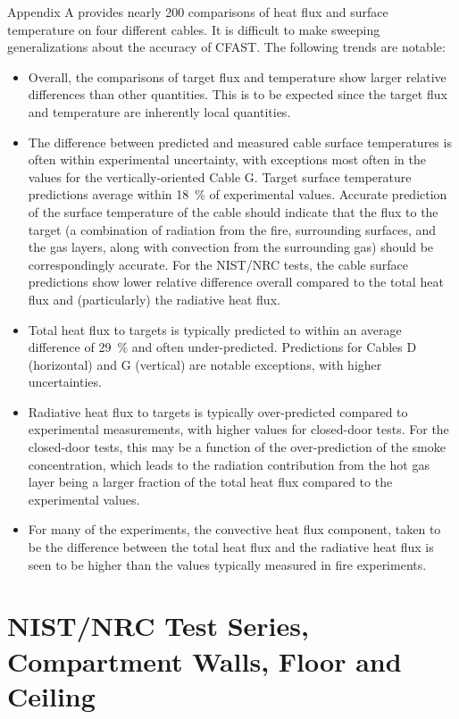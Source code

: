 Appendix A provides nearly 200 comparisons of heat flux and surface temperature on four different cables.  It is difficult to make sweeping generalizations about the accuracy of CFAST.  The following trends are notable:
\begin{itemize}
\item Overall, the comparisons of target flux and temperature show larger relative differences than other quantities. This is to be expected since the target flux and temperature are inherently local quantities.
\item The difference between predicted and measured cable surface temperatures is often within experimental uncertainty, with exceptions most often in the values for the vertically-oriented Cable G.  Target surface temperature predictions average within 18~\% of experimental values.  Accurate prediction of the surface temperature of the cable should indicate that the flux to the target (a combination of radiation from the fire, surrounding surfaces, and the gas layers, along with convection from the surrounding gas) should be correspondingly accurate.  For the NIST/NRC tests, the cable surface predictions show lower relative difference overall compared to the total heat flux and (particularly) the radiative heat flux.
\item Total heat flux to targets is typically predicted to within an average difference of 29~\% and often under-predicted.  Predictions for Cables D (horizontal) and G (vertical) are notable exceptions, with higher uncertainties.
\item Radiative heat flux to targets is typically over-predicted compared to experimental measurements, with higher values for closed-door tests.  For the closed-door tests, this may be a function of the over-prediction of the smoke concentration, which leads to the radiation contribution from the hot gas layer being a larger fraction of the total heat flux compared to the experimental values.
\item For many of the experiments, the convective heat flux component, taken to be the difference between the total heat flux and the radiative heat flux is seen to be higher than the values typically measured in fire experiments.
\end{itemize}


\section{NIST/NRC Test Series, Compartment Walls, Floor and Ceiling}

